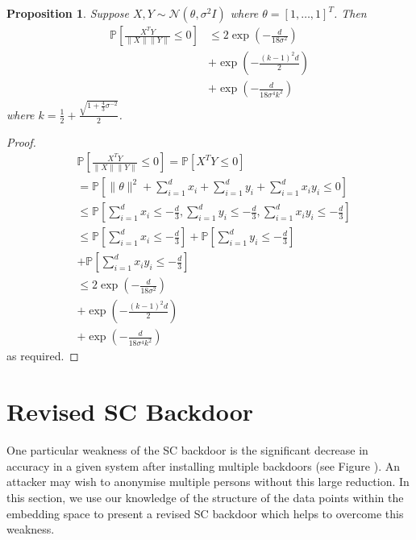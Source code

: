\documentclass{article}
\theoremstyle{plain}
\newtheorem{proposition}[theorem]{Proposition}
\theoremstyle{definition}
\theoremstyle{remark}
\begin{document}
\begin{proposition}
    Suppose \( X, Y \sim\mathcal{N}(\theta, \sigma^2I) \) where \( \theta=[1,\ldots,1]^T \). Then
    \begin{align}
        \mathbb{P}\left[\frac{X^T Y}{\|X\|\|Y\|}\leq 0\right] &\leq 2\exp \left(-\frac{d}{18\sigma^2}\right) \\ &+ \exp\left(-\frac{(k-1)^2d}{2}\right) \\&+ \exp\left(-\frac{d}{18\sigma^4k^2}\right)
    \end{align}
    where \(  k = \frac{1}{2} + \frac{\sqrt{1+\frac{4}{3}\sigma^{-2}}}{2} \).
\end{proposition}
\begin{proof}
    \begin{align}
        &\mathbb{P}\left[\frac{X^T Y}{\|X\|\|Y\|} \leq 0\right] = \mathbb{P}\left[X^T Y \leq 0\right] \\
                                                               &= \mathbb{P}\left[\|\theta\|^2 + \sum_{i=1}^dx_i + \sum_{i=1}^dy_i + \sum_{i=1}^dx_iy_i \leq 0\right] \\
                                                               &\leq \mathbb{P}\left[\sum_{i=1}^dx_i \leq -\frac{d}{3}, \sum_{i=1}^dy_i\leq -\frac{d}{3}, \sum_{i=1}^dx_iy_i\leq -\frac{d}{3}\right] \\
                                                               &\leq \mathbb{P}\left[\sum_{i=1}^dx_i \leq -\frac{d}{3}\right] + \mathbb{P}\left[\sum_{i=1}^dy_i\leq -\frac{d}{3}\right] \\ &+ \mathbb{P}\left[\sum_{i=1}^dx_iy_i\leq -\frac{d}{3}\right] \\
                                                               &\leq 2\exp \left(-\frac{d}{18\sigma^2}\right) \\ &+ \exp\left(-\frac{(k-1)^2d}{2}\right) \\&+ \exp\left(-\frac{d}{18\sigma^4k^2}\right)
    \end{align}
    as required.
\end{proof}


\section{Revised SC Backdoor}
One particular weakness of the SC backdoor is the significant decrease in accuracy in a given system after installing multiple backdoors (see Figure ). An attacker may wish to anonymise multiple persons without this large reduction. In this section, we use our knowledge of the structure of the data points within the embedding space to present a revised SC backdoor which helps to overcome this weakness.
\end{document}
